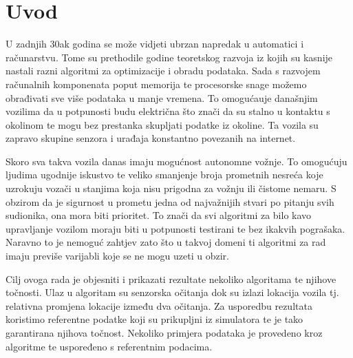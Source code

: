 \chapter{Uvod}

U zadnjih 30ak godina se može vidjeti ubrzan napredak u automatici i računarstvu. Tome su prethodile godine teoretskog razvoja iz kojih su kasnije nastali razni algoritmi za optimizacije i obradu podataka. Sada s razvojem računalnih komponenata poput memorija te procesorske snage možemo obrađivati sve više podataka u manje vremena. To omogućauje današnjim vozilima da u potpunosti budu električna što znači da su stalno u kontaktu s okolinom te mogu bez prestanka skupljati podatke iz okoline. Ta vozila su zapravo skupine senzora i urađaja konstantno povezanih na internet.

Skoro sva takva vozila danas imaju mogućnost autonomne vožnje. To omogućuju ljudima ugodnije iskustvo te veliko smanjenje broja prometnih nesreća koje uzrokuju vozači u stanjima koja nisu prigodna za vožnju ili čistome nemaru. S obzirom da je sigurnost u prometu jedna od najvažnijih stvari po pitanju svih sudionika, ona mora biti prioritet. To znači da svi algoritmi za bilo kavo upravljanje vozilom moraju biti u potpunosti testirani te bez ikakvih pograšaka. Naravno to je nemoguć zahtjev zato što u takvoj domeni ti algoritmi za rad imaju previše varijabli koje se ne mogu uzeti u obzir. 

Cilj ovoga rada je objesniti i prikazati rezultate nekoliko algoritama te njihove točnosti. Ulaz u algoritam su senzorska očitanja dok su izlazi lokacija vozila tj. relativna promjena lokacije između dva očitanja. Za usporedbu rezultata koristimo referentne podatke koji su prikupljni iz simulatora te je tako garantirana njihova točnost. Nekoliko primjera podataka je provedeno kroz algoritme te uspoređeno s referentnim podacima.
